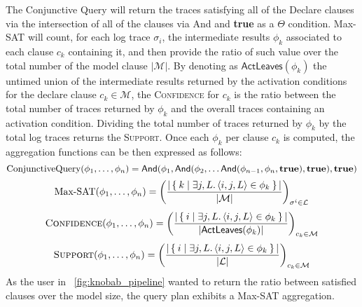The {Conjunctive Query} will return the traces satisfying all of the Declare clauses via the intersection of all of the clauses via \textsf{And} and \textbf{true} as a $\Theta$ condition. Max-SAT will count, for each log trace $\sigma_i$, the intermediate results $\phi_k$ associated to each clause $c_k$ containing it, and then provide the ratio of such value over the total number of the model clause $|\mathcal{M}|$. By denoting as $\textsf{ActLeaves}(\phi_k)$ the untimed union of the intermediate results returned by the activation conditions for the declare clause $c_k\in\mathcal{M}$, the \textsc{Confidence} for $c_k$ is the ratio between the total number of traces returned by $\phi_k$ and the overall traces containing an activation condition. Dividing the total number of traces returned by $\phi_k$ by the total log traces returns the \textsc{Support}. Once each $\phi_k$ per clause $c_k$ is computed, the aggregation functions can be then expressed as follows:
\[\textup{ConjunctiveQuery}(\phi_1,\dots,\phi_n)=\textsf{And}(\phi_1,\textsf{And}(\phi_2,\dots\textsf{And}(\phi_{n-1},\phi_n,\textbf{true}),\textbf{true}),\textbf{true})\]
\[\textup{Max-SAT}(\phi_1,\dots,\phi_n)=\left(\frac{|\Set{k|\exists j,L. \braket{i,j,L}\in\phi_k}|}{|\mathcal{M}|}\right)_{\sigma^i\in \mathcal{L}}\]
\[\textsc{Confidence}(\phi_1,\dots,\phi_n)=\left(\frac{|\Set{i|\exists j,L. \braket{i,j,L}\in \phi_k}|}{|\textsf{ActLeaves}(\phi_k)|}\right)_{c_k\in \mathcal{M}}\]
\[\textsc{Support}(\phi_1,\dots,\phi_n)=\left(\frac{|\Set{i|\exists j,L. \braket{i,j,L}\in \phi_k}|}{|\mathcal{L}|}\right)_{c_k\in \mathcal{M}}\]
As the user in \figurename~\ref{fig:knobab_pipeline} wanted to return the ratio between satisfied clauses over the model size, the query plan exhibits a Max-SAT aggregation.



%	
%	
%	
%	
